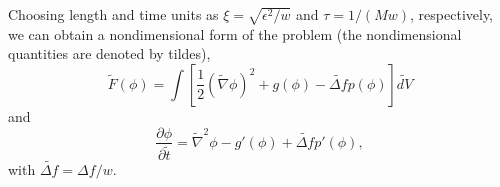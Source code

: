 \documentclass[preprint,12pt]{elsarticle}
\begin{document}
Choosing length and time units as $\xi=\sqrt{\epsilon^2/w}$ and $\tau=1/(Mw)$, respectively, we can obtain a nondimensional form of the problem (the nondimensional quantities are denoted by tildes),
\begin{equation}
    \tilde{F}(\phi)=\int \left[\frac{1}{2}(\tilde{\nabla} \phi)^2+g(\phi)- \widetilde{\Delta f} p(\phi) \right] \widetilde{dV}
    \label{eqn:tFphi}
\end{equation}
and
\begin{equation}
    \frac{\partial \phi}{\partial \tilde{t}}=\tilde{\nabla}^2\phi-g'(\phi)+\widetilde{\Delta f}p'(\phi),
    \label{eqn:dphidtt}
\end{equation}
with $\widetilde{\Delta f}=\Delta f/w$. %
\end{document}
